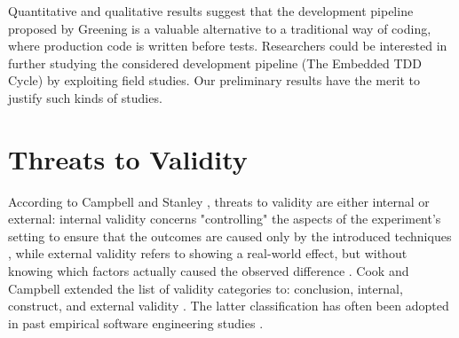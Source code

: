 Quantitative and qualitative results suggest that the development pipeline proposed by Greening\cite{TDDEC} is a valuable alternative to a traditional way of coding, where production code is written before tests. Researchers could be interested in further studying the considered development pipeline (\ie The Embedded TDD Cycle) by exploiting field studies. Our preliminary results have the merit to justify such kinds of studies.

\section{Threats to Validity}
According to Campbell and Stanley \cite{ResearchOfTeaching}, threats to validity are either internal or external: internal validity concerns "controlling" the aspects of the experiment's setting to ensure that the outcomes are caused only by the introduced techniques \cite{DBLP:conf/icse/SiegmundSA15}, while external validity refers to showing a real-world effect, but without knowing which factors actually caused the observed difference \cite{DBLP:conf/icse/SiegmundSA15}.
Cook and Campbell extended the list of validity categories to: conclusion, internal, construct, and external validity \cite{QuasiExp}. The latter classification has often been adopted in past empirical software engineering studies \cite{DBLP:books/sp/WohlinRHOR00}. 


